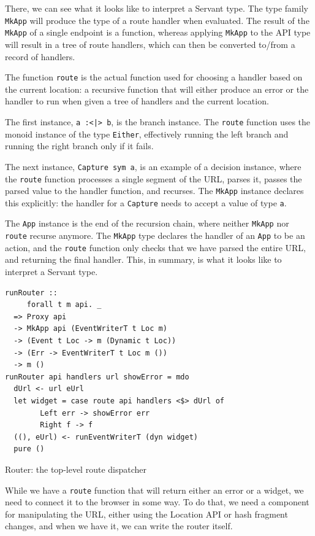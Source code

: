 \documentclass[english,zadani,odsaz]{fitthesis}
\begin{document}
There, we can see what it looks like to interpret a Servant type. The type
family \texttt{MkApp} will produce the type of a route handler when evaluated. The result
of the \texttt{MkApp} of a single endpoint is a function, whereas applying \texttt{MkApp} to the
API type will result in a tree of route handlers, which can then be converted
to/from a record of handlers.

The function \texttt{route} is the actual function used for choosing a handler based on
the current location: a recursive function that will either produce an error or
the handler to run when given a tree of handlers and the current location.

The first instance, \texttt{a :<|> b}, is the branch instance. The \texttt{route} function uses
the monoid instance of the type \texttt{Either}, effectively running the left branch and
running the right branch only if it fails.

The next instance, \texttt{Capture sym a}, is an example of a decision instance, where
the \texttt{route} function processes a single segment of the URL, parses it, passes the
parsed value to the handler function, and recurses. The \texttt{MkApp} instance declares
this explicitly: the handler for a \texttt{Capture} needs to accept a value of type \texttt{a}.

The \texttt{App} instance is the end of the recursion chain, where neither \texttt{MkApp} nor
\texttt{route} recurse anymore. The \texttt{MkApp} type declares the handler of an \texttt{App} to be an
action, and the \texttt{route} function only checks that we have parsed the entire URL,
and returning the final handler. This, in summary, is what it looks like to
interpret a Servant type.

\begin{listing}[!t]
\begin{verbatim}
runRouter ::
     forall t m api. _
  => Proxy api
  -> MkApp api (EventWriterT t Loc m)
  -> (Event t Loc -> m (Dynamic t Loc))
  -> (Err -> EventWriterT t Loc m ())
  -> m ()
runRouter api handlers url showError = mdo
  dUrl <- url eUrl
  let widget = case route api handlers <$> dUrl of
        Left err -> showError err
        Right f -> f
  ((), eUrl) <- runEventWriterT (dyn widget)
  pure ()

\end{verbatim}
\caption{Router: the top-level route dispatcher \label{router-url}}
\end{listing}

While we have a \texttt{route} function that will return either an error or a widget, we
need to connect it to the browser in some way. To do that, we need a component
for manipulating the URL, either using the Location API or hash fragment
changes, and when we have it, we can write the router itself.
\end{document}
